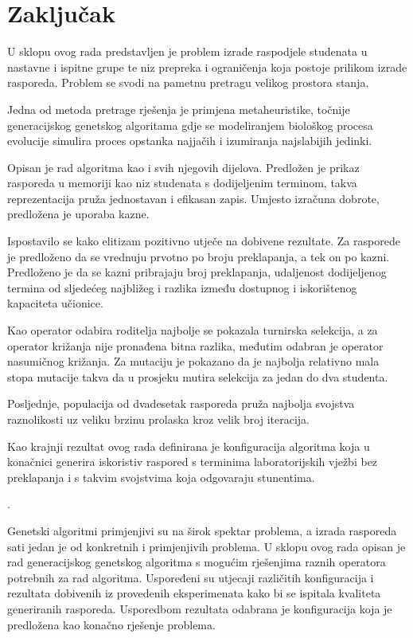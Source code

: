 \documentclass[times, utf8, zavrsni]{fer}
\begin{document}
\chapter{Zaključak}

U sklopu ovog rada predstavljen je problem izrade raspodjele studenata u nastavne i ispitne grupe te niz prepreka i ograničenja koja postoje prilikom izrade rasporeda. Problem se svodi na pametnu pretragu velikog prostora stanja.

Jedna od metoda pretrage rješenja je primjena metaheuristike, točnije generacijskog genetskog algoritama gdje se modeliranjem biološkog procesa evolucije simulira proces opstanka najjačih i izumiranja najslabijih jedinki.

Opisan je rad algoritma kao i svih njegovih dijelova. Predložen je prikaz rasporeda u memoriji kao niz studenata s dodijeljenim terminom, takva reprezentacija pruža jednostavan i efikasan zapis. Umjesto izračuna dobrote, predložena je uporaba kazne.

Ispostavilo se kako elitizam pozitivno utječe na dobivene rezultate. Za rasporede je predloženo da se vrednuju prvotno po broju preklapanja, a tek on po kazni. Predloženo je da se kazni pribrajaju broj preklapanja, udaljenost dodijeljenog termina od sljedećeg najbližeg i razlika između dostupnog i iskorištenog kapaciteta učionice.

Kao operator odabira roditelja najbolje se pokazala turnirska selekcija, a za operator križanja nije pronađena bitna razlika, međutim odabran je operator nasumičnog križanja. Za mutaciju je pokazano da je najbolja relativno mala stopa mutacije takva da u prosjeku mutira selekcija za jedan do dva studenta.

Posljednje, populacija od dvadesetak rasporeda pruža najbolja svojstva raznolikosti uz veliku brzinu prolaska kroz velik broj iteracija.

Kao krajnji rezultat ovog rada definirana je konfiguracija algoritma koja u konačnici generira iskoristiv raspored s terminima laboratorijskih vježbi bez preklapanja i s takvim svojstvima koja odgovaraju stunentima.

.


\begin{sazetak}
Genetski algoritmi primjenjivi su na širok spektar problema, a izrada rasporeda sati jedan je od konkretnih i primjenjivih problema. U sklopu ovog rada opisan je rad generacijskog genetskog algoritma s mogućim rješenjima raznih operatora potrebnih za rad algoritma. Uspoređeni su utjecaji različitih konfiguracija i rezultata dobivenih iz provedenih eksperimenata kako bi se ispitala kvaliteta generiranih rasporeda. Usporedbom rezultata odabrana je konfiguracija koja je predložena kao konačno rješenje problema.

\end{sazetak}
\end{document}
